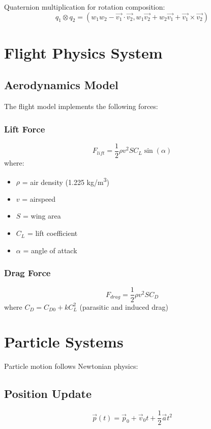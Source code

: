 \documentclass{article}
\begin{document}
Quaternion multiplication for rotation composition:
\begin{equation}
q_1 \otimes q_2 = (w_1w_2 - \vec{v_1}\cdot\vec{v_2}, w_1\vec{v_2} + w_2\vec{v_1} + \vec{v_1}\times\vec{v_2})
\end{equation}

\section{Flight Physics System}

\subsection{Aerodynamics Model}
The flight model implements the following forces:

\subsubsection{Lift Force}
\begin{equation}
F_{lift} = \frac{1}{2}\rho v^2 S C_L \sin(\alpha)
\end{equation}
where:
\begin{itemize}
\item $\rho$ = air density (1.225 kg/m\textsuperscript{3})
\item $v$ = airspeed
\item $S$ = wing area
\item $C_L$ = lift coefficient
\item $\alpha$ = angle of attack
\end{itemize}

\subsubsection{Drag Force}
\begin{equation}
F_{drag} = \frac{1}{2}\rho v^2 S C_D
\end{equation}
where $C_D = C_{D0} + kC_L^2$ (parasitic and induced drag)

\section{Particle Systems}
Particle motion follows Newtonian physics:

\subsection{Position Update}
\begin{equation}
\vec{p}(t) = \vec{p}_0 + \vec{v}_0t + \frac{1}{2}\vec{a}t^2
\end{equation}
\end{document}
